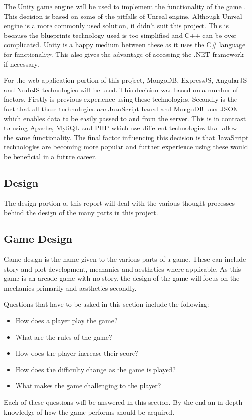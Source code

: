 \documentclass[12pt]{article}
\begin{document}
The Unity game engine will be used to implement the functionality of the game . This decision is based on some of the pitfalls of Unreal engine. Although Unreal engine is a more commonly used solution, it didn't suit this project. This is because the blueprints technology used is too simplified and C++ can be over complicated. Unity is a happy medium between these as it uses the C{\#} language for functionality. This also gives the advantage of accessing the .NET framework if necessary. 

For the web application portion of this project, MongoDB, ExpressJS, AngularJS and NodeJS technologies will be used. This decision was based on a number of factors. Firstly is previous experience using these technologies. Secondly is the fact that all these technologies are JavaScript based and MongoDB uses JSON which enables data to be easily passed to and from the server. This is in contrast to using Apache, MySQL and PHP which use different technologies that allow the same functionality. The final factor influencing this decision is that JavaScript technologies are becoming more popular and further experience using these would be beneficial in a future career. 

\newpage
\begin{center}
\section{Design}
\end{center}
The design portion of this report will deal with the various thought processes behind the design of the many parts in this project. 

{\centering \subsection{Game Design}}
Game design is the name given to the various parts of a game. These can include story and plot development, mechanics and aesthetics where applicable. As this game is an arcade game with no story, the design of the game will focus on the mechanics primarily and aesthetics secondly. 

Questions that have to be asked in this section include the following:

\begin{itemize}
\item How does a player play the game?
\item What are the rules of the game?
\item How does the player increase their score?
\item How does the difficulty change as the game is played?
\item What makes the game challenging to the player?
\end{itemize}
Each of these questions will be answered in this section. By the end an in depth knowledge of how the game performs should be acquired. 
\end{document}
